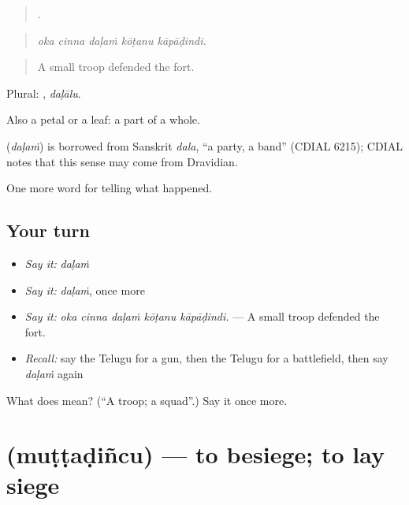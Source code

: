 \begin{quote}
    .
\end{quote}

\begin{quote}
\emph{oka cinna daḷaṁ kōṭanu kāpāḍindi.}
\end{quote}

\begin{quote}
A small troop defended the fort.
\end{quote}

Plural: , \emph{daḷālu}.

Also a petal or a leaf: a part of a whole.

\begin{cousinweb}
\textbf{} (\emph{daḷaṁ}) is borrowed from Sanskrit \emph{dala}, \textquotedblleft{}a party, a band\textquotedblright{} (CDIAL 6215); CDIAL notes that this sense may come from Dravidian.
\end{cousinweb}

\begin{grammarlens}[title={What you've built}]
One more word for telling what happened.
\end{grammarlens}

\subsection*{Your turn}
\begin{itemize}
\raggedright
  \item \emph{Say it:} \emph{daḷaṁ}
  \item \emph{Say it:} \emph{daḷaṁ}, once more
  \item \emph{Say it:} \emph{oka cinna daḷaṁ kōṭanu kāpāḍindi.} — A small troop defended the fort.
  \item \emph{Recall:} say the Telugu for a gun, then the Telugu for a battlefield, then say \emph{daḷaṁ} again
\end{itemize}

\begin{tcolorbox}[breakable,colback=teal!4,colframe=teal!35!black,title={Before you move on}]
What does  mean? (\textquotedblleft{}A troop; a squad\textquotedblright{}.) Say it once more.
\end{tcolorbox}
\section[\texorpdfstring{\te{ముట్టడించు} (muṭṭaḍiñcu)}{ముట్టడించు (muṭṭaḍiñcu)}]{ (muṭṭaḍiñcu) — to besiege; to lay siege}

